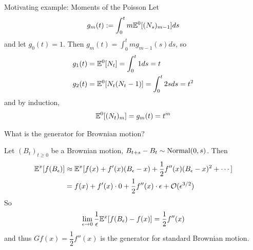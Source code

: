 \documentclass[classnotes]{fillsntsx}
\begin{document}
\begin{exmp}{Motivating example: Moments of the Poisson}
Let 
$$\begin{aligned}
g_{m}(t) := \int_0^{t} m \mathbb{E}^{0} [(N_s)_{m-1}] ds
\end{aligned}$$ 
and let $g_0(t) = 1$. 
Then $g_{m}(t) = \int_0^{t} m g_{m-1}(s) ds$, so
$$\begin{aligned}
g_1(t) &=  \mathbb{E}^0 [N_t]=  \int_{0}^{t}  1ds = t \\
g_2(t) &= \mathbb{E}^0 [N_t(N_t - 1)]  =  \int_{0}^{t}  2sds = t^2 \\
\end{aligned}$$
and by induction,
$$\begin{aligned}
  \mathbb{E}^0 [(N_t)_m] = g_m(t) = t^m
  \end{aligned}$$
\end{exmp}

\begin{exmp}{What is the generator for Brownian motion?}

Let $(B_t)_{t \geq 0}$ be a Brownian motion, $B_{t+s} - B_t \sim \operatorname{Normal}(0, s)$. 
Then
$$\begin{aligned}
\mathbb{E}^x[f(B_\epsilon)] &\approx \mathbb{E}^x[ f(x) + f'(x) (B_\epsilon - x) + \frac{1}{2}f''(x)(B_\epsilon - x)^2 + \cdots] \\
& =  f(x) + f'(x)\cdot 0 +  \frac{1}{2}f''(x) \cdot \epsilon + \mathcal{O}(\epsilon^{3/2})
\end{aligned}$$
So
$$\begin{aligned}
\lim_{\epsilon \to 0} \dfrac{1}{\epsilon} \mathbb{E}^{x}[ f(B_\epsilon) - f(x) ] = \dfrac{1}{2} f''(x)
\end{aligned}$$
and thus $Gf(x) = \dfrac{1}{2} f''(x)$ is the generator for standard Brownian motion. 

\end{exmp}
\end{document}
